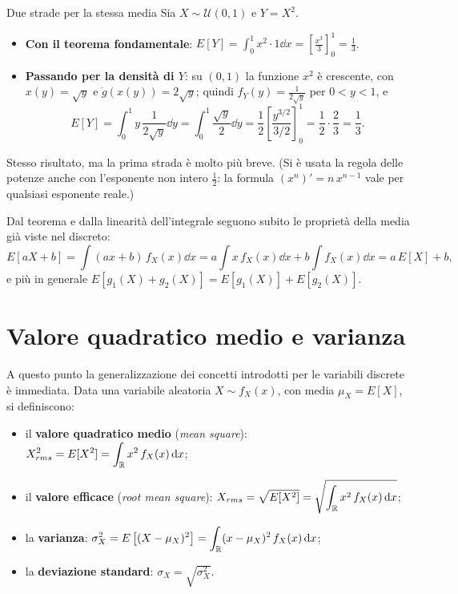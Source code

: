 \begin{esempio}{Due strade per la stessa media}
Sia $X \sim \mathcal{U}(0, 1)$ e $Y = X^2$.
\begin{itemize}
  \item \textbf{Con il teorema fondamentale}: $E[Y] = \int_0^1 x^2 \cdot 1 \dd x = \left[ \frac{x^3}{3} \right]_0^1 =
        \frac13$.
  \item \textbf{Passando per la densità di $Y$}: su $(0, 1)$ la funzione $x^2$ è crescente, con $x(y) = \sqrt{y}$ e
        $\dot g(x(y)) = 2\sqrt{y}$; quindi $f_Y(y) = \frac{1}{2\sqrt{y}}$ per $0 < y < 1$, e
        \[ E[Y] = \int_0^1 y\, \frac{1}{2\sqrt{y}} \dd y = \int_0^1 \frac{\sqrt{y}}{2} \dd y = \frac12 \left[ \frac{y^{3/2}}{3/2}
           \right]_0^1 = \frac12 \cdot \frac23 = \frac13 . \]
\end{itemize}
Stesso risultato, ma la prima strada è molto più breve. (Si è usata la regola delle potenze anche con l'esponente non
intero $\frac12$: la formula $(x^n)' = n\,x^{n-1}$ vale per qualsiasi esponente reale.)
\end{esempio}

Dal teorema e dalla linearità dell'integrale seguono subito le proprietà della media già viste nel discreto:
\[ E[aX + b] = \int (ax + b)\, f_X(x) \dd x = a \int x\, f_X(x) \dd x + b \int f_X(x) \dd x = a\, E[X] + b , \]
e più in generale $E[g_1(X) + g_2(X)] = E[g_1(X)] + E[g_2(X)]$.

\section{Valore quadratico medio e varianza}

A questo punto la generalizzazione dei concetti introdotti per le variabili discrete è immediata. Data una variabile
aleatoria $X \sim f_X(x)$, con media $\mu_X = E[X]$, si definiscono:
\begin{itemize}
  \item il \textbf{valore quadratico medio} (\emph{mean square}): $\displaystyle X_{rms}^2 = E[X^2] = \int_{\mathbb{R}} x^2\,
        f_X(x) \,\mathrm{d} x$;
  \item il \textbf{valore efficace} (\emph{root mean square}): $\displaystyle X_{rms} = \sqrt{E[X^2]} = \sqrt{\int_{\mathbb{R}}
        x^2\, f_X(x) \,\mathrm{d} x}$;
  \item la \textbf{varianza}: $\displaystyle \sigma_X^2 = E\left[(X - \mu_X)^2\right] = \int_{\mathbb{R}} (x - \mu_X)^2\, f_X(x)
        \,\mathrm{d} x$;
  \item la \textbf{deviazione standard}: $\sigma_X = \sqrt{\sigma_X^2}$.
\end{itemize}

